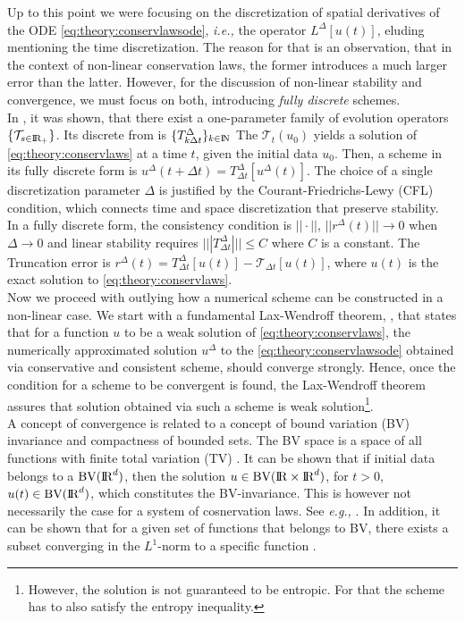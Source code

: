 \documentclass[11pt,a4paper,headinclude=true,DIV=14,BCOR=8mm,chapterprefix,listof=totoc,twoside,openright,abstracton]{scrbook}
\begin{document}
Up to this point we were focusing on the discretization of spatial derivatives of the ODE \ref{eq:theory:conservlawsode}, \textit{i.e.,} the operator $L^{\Delta}[u(t)]$, eluding mentioning the time discretization. The reason for that is an observation, that in the context of non-linear conservation laws, the former introduces a much larger error than the latter. However, for the discussion of non-linear stability and convergence, we must focus on both, introducing \textit{fully discrete} schemes.\\
In \cite{Kruzkov:1970}, it was shown, that there exist a one-parameter family of evolution operators $\{\mathcal{T}_{s\in\text{I\!R}_+}\}$. Its discrete from is $\{ T^{\Delta} _{k \Delta t} \}_{k\in\text{I\!N}}$ The $\mathcal{T}_t(u_0)$ yields a solution of \ref{eq:theory:conservlaws} at a time $t$, given the initial data $u_0$. Then, a scheme in its fully discrete form is $ u^{\Delta}(t+\Delta t) = T^{\Delta} _{\Delta t}[u^{\Delta}(t)]$. The choice of a single discretization parameter $\Delta$ is justified by the Courant-Friedrichs-Lewy (CFL) condition, which connects time and space discretization that preserve stability. \\
In a fully discrete form, the consistency condition is $||\cdot||$, $||r^{\Delta}(t)||\rightarrow 0$ when $\Delta\rightarrow 0$ and linear stability requires $|||T^{\Delta}_{\Delta t}||| \leq C$ where $C$ is a constant. The Truncation error is $r^{\Delta}(t) = T^{\Delta}_{\Delta t}[u(t)] - \mathcal{T}_{\Delta t}[u(t)]$, where $u(t)$ is the exact solution to \ref{eq:theory:conservlaws}. \\


Now we proceed with outlying how a numerical scheme can be constructed in a non-linear case. We start with a fundamental Lax-Wendroff theorem, \cite{Lax:1960}, that states that for a function $u$ to be a weak solution of \ref{eq:theory:conservlaws}, the numerically approximated solution $u^{\Delta}$ to the \ref{eq:theory:conservlawsode} obtained via conservative and consistent scheme, should converge strongly. Hence, once the condition for a scheme to be convergent is found, the Lax-Wendroff theorem assures that solution obtained via such a scheme is weak solution\footnote{However, the solution is not guaranteed to be entropic. For that the scheme has to also satisfy the entropy inequality.}. \\

A concept of convergence is related to a concept of bound variation (BV) invariance and compactness of bounded sets. The BV space is a space of all functions with finite total variation (TV) \cite{Luigi:2002}. It can be shown that if initial data belongs to a $\text{BV}(\text{I\!R}^d)$, then the solution $u \in \text{BV}(\text{I\!R}\times\text{I\!R}^d)$, for $t > 0$, $u(t) \in \text{BV}(\text{I\!R}^d)$, which constitutes the BV-invariance. This is however not necessarily the case for a system of cosnervation laws. See \textit{e.g.,} \cite{Chen:2006}. In addition, it can be shown that for a given set of functions that belongs to BV, there exists a subset converging in the $L^1$-norm to a specific function \cite{Luigi:2002}. \\
\end{document}

